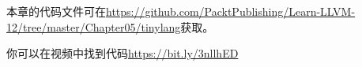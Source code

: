 本章的代码文件可在\url{https://github.com/PacktPublishing/Learn-LLVM-12/tree/master/Chapter05/tinylang}获取。\par

你可以在视频中找到代码\url{https://bit.ly/3nllhED}\par